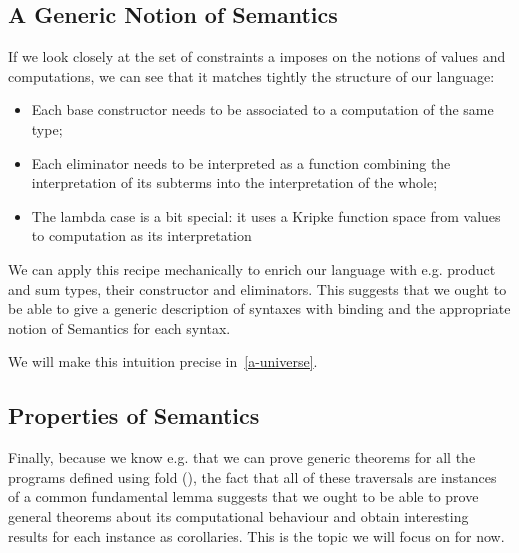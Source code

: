 \subsection{A Generic Notion of Semantics}

If we look closely at the set of constraints a  imposes on the
notions of values and computations, we can see that it matches tightly the
structure of our language:

\begin{itemize}
  \item Each base constructor needs to be associated to a computation of the
    same type;
  \item Each eliminator needs to be interpreted as a function combining the
    interpretation of its subterms into the interpretation of the whole;
  \item The lambda case is a bit special: it uses a Kripke function space
    from values to computation as its interpretation
\end{itemize}

We can apply this recipe mechanically to enrich our language with e.g.
product and sum types, their constructor and eliminators. This suggests
that we ought to be able to give a generic description of syntaxes with
binding and the appropriate notion of Semantics for each syntax.

We will make this intuition precise in~\cref{a-universe}.

\subsection{Properties of Semantics}

Finally, because we know e.g. that we can prove generic theorems for all the
programs defined using fold (\cite{DBLP:journals/scp/Malcolm90}), the fact
that all of these traversals are instances of a common fundamental lemma
suggests that we ought to be able to prove general theorems about its
computational behaviour and obtain interesting results for each instance
as corollaries. This is the topic we will focus on for now.
